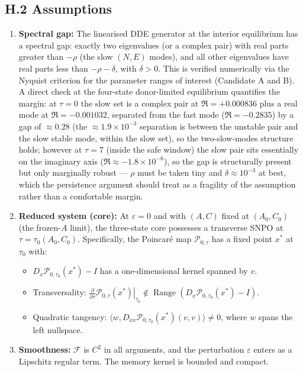 \documentclass[twocolumn,10pt]{article}
\begin{document}
\subsection{H.2 Assumptions}
\begin{enumerate}
    \item \textbf{Spectral gap:} The linearised DDE generator at the interior equilibrium has a spectral gap: exactly two eigenvalues (or a complex pair) with real parts greater than $-\rho$ (the slow $(N,E)$ modes), and all other eigenvalues have real parts less than $-\rho - \delta$, with $\delta > 0$. This is verified numerically via the Nyquist criterion for the parameter ranges of interest (Candidate A and B). A direct check at the four-state donor-limited equilibrium quantifies the margin: at $\tau=0$ the slow set is a complex pair at $\Re=+0.000836$ plus a real mode at $\Re=-0.001032$, separated from the fast mode ($\Re=-0.2835$) by a gap of $\approx0.28$ (the $\approx1.9\times10^{-3}$ separation is between the unstable pair and the slow stable mode, within the slow set), so the two-slow-modes structure holds; however at $\tau=7$ (inside the safe window) the slow pair sits essentially on the imaginary axis ($\Re\approx-1.8\times10^{-6}$), so the gap is structurally present but only marginally robust --- $\rho$ must be taken tiny and $\delta\approx10^{-3}$ at best, which the persistence argument should treat as a fragility of the assumption rather than a comfortable margin.
    \item \textbf{Reduced system (core):} At $\varepsilon = 0$ and with $(A, C)$ fixed at $(A_0, C_0)$ (the frozen-$A$ limit), the three-state core possesses a transverse SNPO at $\tau = \tau_0(A_0, C_0)$. Specifically, the Poincaré map $\mathcal{P}_{0,\tau}$ has a fixed point $x^*$ at $\tau_0$ with:
    \begin{itemize}
        \item $D_x \mathcal{P}_{0,\tau_0}(x^*) - I$ has a one-dimensional kernel spanned by $v$.
        \item Transversality: $\left.\frac{\partial}{\partial \tau} \mathcal{P}_{0,\tau}(x^*)\right|_{\tau_0} \notin \operatorname{Range}(D_x \mathcal{P}_{0,\tau_0}(x^*) - I)$.
        \item Quadratic tangency: $\langle w, D_{xx} \mathcal{P}_{0,\tau_0}(x^*)(v, v) \rangle \neq 0$, where $w$ spans the left nullspace.
    \end{itemize}
    \item \textbf{Smoothness:} $\mathcal{F}$ is $C^2$ in all arguments, and the perturbation $\varepsilon$ enters as a Lipschitz regular term. The memory kernel is bounded and compact.
\end{enumerate}
\end{document}
